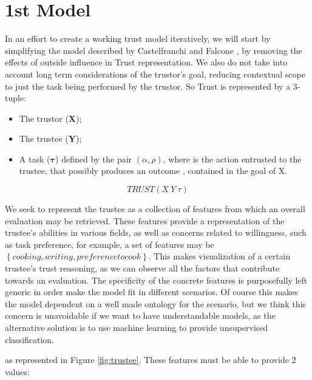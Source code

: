 \section{1st Model}
\label{sec:Model}

In an effort to create a working trust model iteratively, we will start by simplifying the model described by Castelfranchi and Falcone \cite{Castelfranchi1998}, by removing the effects of outside influence in Trust representation. We also do not take into account long term considerations of the trustor's goal, reducing contextual scope to just the task being performed by the trustor. So Trust is represented by a 3-tuple:

\begin{itemize}
	\item The trustor (\textbf{X});
	\item The trustee (\textbf{Y});
	\item A task ($\bm{\tau}$) defined by the pair $(\alpha, \rho)$, where \bm{$\alpha$} is the action entrusted to the trustee, that possibly produces an outcome \bm{$\rho$}, contained in the goal of X.
\end{itemize}
\begin{equation}
TRUST(X\ Y\ \tau)
\label{eq:TrustRelation}
\end{equation}

We seek to represent the trustee as a collection of features from which an overall evaluation may be retrieved. These features provide a representation of the trustee's abilities in various fields, as well as concerns related to willingness, such as task preference, for example, a set of features may be $\left\{cooking, writing, preference to cook\right\}$. This makes visualization of a certain trustee's trust reasoning, as we can observe all the factors that contribute towards an evaluation. The specificity of the concrete features is purposefully left generic in order make the model fit in different scenarios. Of course this makes the model dependent on a well made ontology for the scenario, but we think this concern is unavoidable if we want to have understandable models, as the alternative solution is to use machine learning to provide unsupervised classification.

 as represented in Figure \ref{fig:trustee}. These features must be able to provide 2 values:

